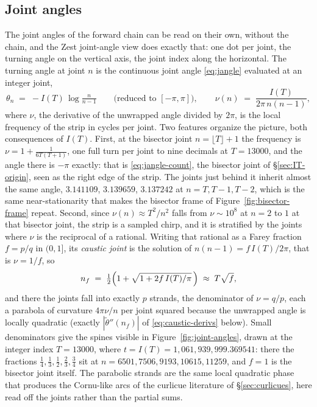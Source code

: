 \documentclass[11pt]{article}
\theoremstyle{definition}
\begin{document}
\subsection{Joint angles}\label{sec:joint-angles}

The joint angles of the forward chain can be read on their own, without the
chain, and the Zest joint-angle view does exactly that: one dot per joint,
the turning angle on the vertical axis, the joint index along the horizontal.
The turning angle at joint $n$ is the continuous joint angle \eqref{eq:jangle}
evaluated at an integer joint,
\begin{equation}\label{eq:theta-joint}
\theta_n \;=\; -I(T)\,\log\tfrac{n}{n-1}
\qquad\text{(reduced to $[-\pi,\pi]$)},
\qquad
\nu(n) \;=\; \frac{I(T)}{2\pi\,n(n-1)},
\end{equation}
where $\nu$, the derivative of
the unwrapped angle divided by $2\pi$, is the local frequency of the strip in
cycles per joint. Two features organize the picture, both consequences of
$I(T)$. First, at the bisector joint $n=\lfloor T\rfloor+1$ the frequency is
$\nu=1+\frac{1}{6T(T+1)}$, one full turn per joint to nine decimals at
$T=13000$, and the angle there is $-\pi$ exactly: that is
\eqref{eq:jangle-count}, the bisector joint of \S\ref{sec:IT-origin}, seen as the right
edge of the strip. The joints just behind it inherit almost the same angle,
$3.141109$, $3.139659$, $3.137242$ at $n=T,T-1,T-2$, which is the same
near-stationarity that makes the bisector frame of
Figure~\ref{fig:bisector-frame} repeat. Second, since
$\nu(n)\approx T^{2}/n^{2}$ falls from $\nu\sim10^{8}$ at $n=2$ to $1$ at that
bisector joint, the strip is a sampled chirp, and it is stratified by the joints where
$\nu$ is the reciprocal of a rational. Writing that rational as a Farey
fraction $f=p/q$ in $(0,1]$, its \emph{caustic joint} is the solution of
$n(n-1)=f\,I(T)/2\pi$, that is $\nu=1/f$, so
\begin{equation}\label{eq:caustic-joint}
n_{f}\;=\;\tfrac12\Bigl(1+\sqrt{1+2f\,I(T)/\pi}\,\Bigr)\;\approx\;T\sqrt{f},
\end{equation}
and there the joints fall into exactly $p$ strands, the denominator of
$\nu=q/p$, each a parabola of curvature $4\pi\nu/n$ per joint squared because
the unwrapped angle is locally quadratic (exactly
$|\widetilde\theta''(n_f)|$ of \eqref{eq:caustic-derivs} below). Small denominators give the spines
visible in Figure~\ref{fig:joint-angles}, drawn at the integer index $T=13000$,
where $t=I(T)=1{,}061{,}939{,}999.369541$: there the fractions
$\tfrac14,\tfrac13,\tfrac12,\tfrac23,\tfrac34$ sit at
$n=6501,7506,9193,10615,11259$, and $f=1$ is the bisector joint itself. The parabolic
strands are the same local quadratic phase that produces the Cornu-like arcs of
the curlicue literature of \S\ref{sec:curlicues}, here read off the joints
rather than the partial sums.
\end{document}
